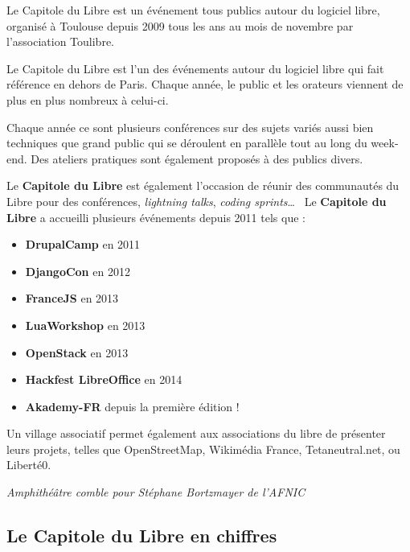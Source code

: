 
Le Capitole du Libre est un événement tous publics autour du logiciel libre,
 organisé à Toulouse depuis 2009 tous les ans au mois de novembre
 par l'association Toulibre.

Le Capitole du Libre est l'un des événements autour du logiciel libre
 qui fait référence en dehors de Paris.
 Chaque année, le public et les orateurs viennent de plus en plus nombreux
 à celui-ci.

Chaque année ce sont plusieurs conférences sur des sujets variés
 aussi bien techniques que grand public qui se déroulent en parallèle
 tout au long du week-end.
 Des ateliers pratiques sont également proposés à des publics divers.

\Separateur

Le \textbf{Capitole du Libre} est également l'occasion de réunir des 
communautés du Libre pour des conférences, \textit{lightning talks}, 
\textit{coding sprints}\dots ~ Le \textbf{Capitole du Libre} a 
accueilli plusieurs événements depuis 2011 tels que :
\begin{itemize}[label=$\bullet$]
\item \textbf{DrupalCamp} en 2011
\item \textbf{DjangoCon} en 2012
\item \textbf{FranceJS} en 2013
\item \textbf{LuaWorkshop} en 2013
\item \textbf{OpenStack} en 2013
\item \textbf{Hackfest LibreOffice}  en 2014
\item \textbf{Akademy-FR} depuis la première édition !
\end{itemize}

\Separateur

Un village associatif permet également aux associations du libre de
 présenter leurs projets, telles que OpenStreetMap, Wikimédia France, 
Tetaneutral.net, ou Liberté0.

\begin{center}
\textit{Amphithéâtre comble pour Stéphane Bortzmayer de l'AFNIC}
\end{center}

\subsection{Le Capitole du Libre en chiffres}

